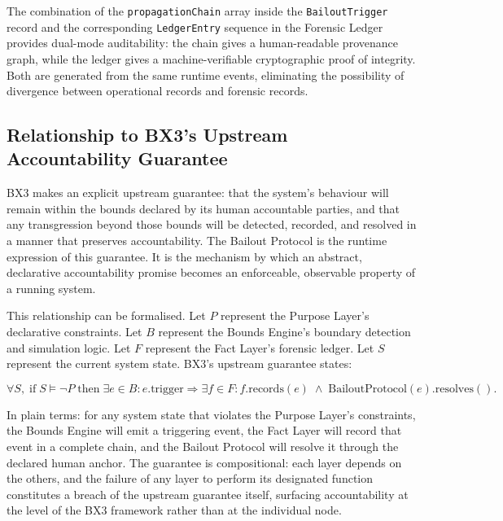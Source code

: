 The combination of the \texttt{propagationChain} array inside the \texttt{BailoutTrigger} record and the corresponding \texttt{LedgerEntry} sequence in the Forensic Ledger provides dual-mode auditability: the chain gives a human-readable provenance graph, while the ledger gives a machine-verifiable cryptographic proof of integrity. Both are generated from the same runtime events, eliminating the possibility of divergence between operational records and forensic records.

\subsection{Relationship to BX3's Upstream Accountability Guarantee}
\label{sec:upstream-guarantee}

BX3 makes an explicit upstream guarantee: that the system's behaviour will remain within the bounds declared by its human accountable parties, and that any transgression beyond those bounds will be detected, recorded, and resolved in a manner that preserves accountability. The Bailout Protocol is the runtime expression of this guarantee. It is the mechanism by which an abstract, declarative accountability promise becomes an enforceable, observable property of a running system.

This relationship can be formalised. Let $P$ represent the Purpose Layer's declarative constraints. Let $B$ represent the Bounds Engine's boundary detection and simulation logic. Let $F$ represent the Fact Layer's forensic ledger. Let $S$ represent the current system state. BX3's upstream guarantee states:

\begin{equation}
\forall S,\; \text{if}\; S \models \neg P \;\text{then}\;
\exists e \in B : e.\text{trigger} \Rightarrow
\exists f \in F : f.\text{records}(e) \;\land\; \text{BailoutProtocol}(e).\text{resolves}() .
\tag{UG}
\end{equation}

In plain terms: for any system state that violates the Purpose Layer's constraints, the Bounds Engine will emit a triggering event, the Fact Layer will record that event in a complete chain, and the Bailout Protocol will resolve it through the declared human anchor. The guarantee is compositional: each layer depends on the others, and the failure of any layer to perform its designated function constitutes a breach of the upstream guarantee itself, surfacing accountability at the level of the BX3 framework rather than at the individual node.

